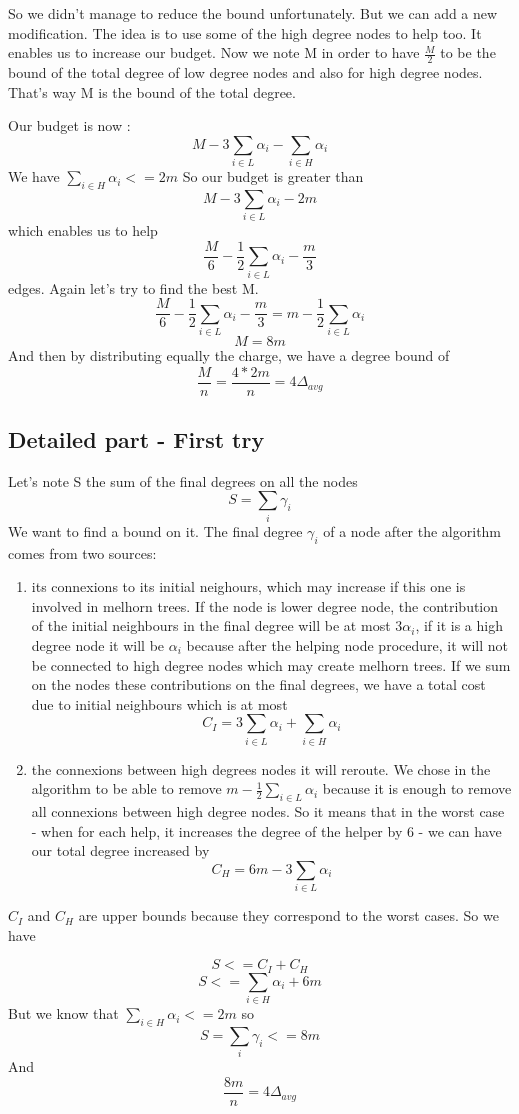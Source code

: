 \documentclass{article}
\begin{document}
So we didn't manage to reduce the bound unfortunately. But we can add a
new modification. The idea is to use some of the high degree nodes to help too. It enables
us to increase our budget. Now we note M in order to have $\frac{M}{2}$
to be the bound of the total degree of low degree nodes and also for high
degree nodes. That's way M is the bound of the total degree.

Our budget is now :
$$M - 3\sum_{i \in L}\alpha_i - \sum_{i \in H}\alpha_i$$
We have $\sum_{i \in H}\alpha_i <= 2m$
So our budget is greater than
$$M - 3\sum_{i \in L}\alpha_i -2m$$
which enables us to help
$$\frac{M}{6} - \frac{1}{2}\sum_{i \in L}\alpha_i - \frac{m}{3}$$
edges. Again let's try to find the best M.
$$\frac{M}{6} - \frac{1}{2}\sum_{i \in L}\alpha_i - \frac{m}{3} = m - \frac{1}{2}\sum_{i \in L}\alpha_i$$
$$M = 8m$$
And then by distributing equally the charge, we have a degree bound of
$$\frac{M}{n} = \frac{4*2m}{n} = 4\Delta_{avg}$$

\subsection{Detailed part - First try}

Let's note S the sum of the final degrees on all the nodes
$$S = \sum_{i}\gamma_i$$
We want to find a bound on it.
The final degree $\gamma_i$ of a node after the algorithm comes from two sources:

\begin{enumerate}
  \item its connexions to its initial neighours, which may increase
  if this one is involved in melhorn trees. If the node is lower degree node, the contribution of the initial
  neighbours in the final degree will be at most $3\alpha_i$, if it
  is a high degree node it will be $\alpha_i$ because after the helping
  node procedure, it will not be connected to high degree nodes which
  may create melhorn trees. If we sum on the nodes these contributions
  on the final degrees, we have a total cost due to initial neighbours
  which is at most
  $$C_I = 3\sum_{i \in L}\alpha_i + \sum_{i \in H}\alpha_i$$
  \item the connexions between high degrees nodes it will reroute.
  We chose in the algorithm to be able to remove
  $m - \frac{1}{2}\sum_{i \in L}\alpha_i$ because it is enough to
  remove all connexions between high degree nodes. So it means
  that in the worst case - when for each help, it increases the degree
  of the helper by 6 - we can have our total degree increased by
  $$C_H = 6m - 3\sum_{i \in L}\alpha_i$$
\end{enumerate}

$C_I$ and $C_H$ are upper bounds because they correspond to the worst
cases. So we have

$$S <= C_I + C_H$$
$$S <= \sum_{i \in H}\alpha_i + 6m$$
But we know that $\sum_{i \in H}\alpha_i <= 2m$
so $$S = \sum_{i}\gamma_i <= 8m$$
And $$\frac{8m}{n} = 4\Delta_{avg}$$
\end{document}
